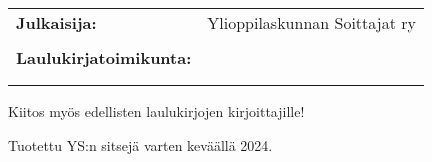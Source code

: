\newdoublepage


\thispagestyle{empty}

\begin{footnotesize}
	
	\newlength{\currentparskip}
	\setlength{\currentparskip}{\parskip} %
	
	\null
	\vfill
	\begin{minipage}{\textwidth}
	
	    \setlength{\parskip}{\currentparskip} %
	    
	    \begin{tabular}{l l}
			\textbf{Julkaisija:}			& Ylioppilaskunnan Soittajat ry				\\
											&							\\
			\textbf{Laulukirjatoimikunta:}	& \citeauthor{anton_taleiko}    \\
                                            & \citeauthor{sara_tahvonen}	\\
                                            & \citeauthor{ronja_forsen}		\\
	    \end{tabular}
	    
	    \vspace{.2cm}
	    
	    Kiitos myös edellisten laulukirjojen kirjoittajille!

        Tuotettu YS:n sitsejä varten keväällä 2024.
	
	\end{minipage}
		
\end{footnotesize}








	

